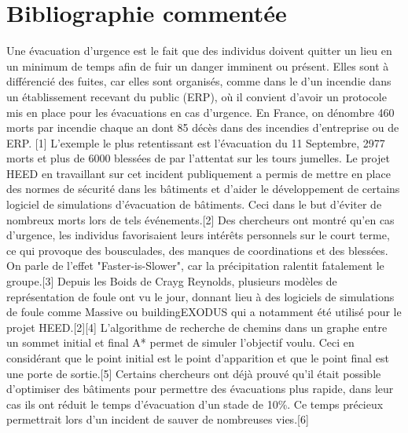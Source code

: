 \documentclass[12pt]{article}
\begin{document}
\section*{Bibliographie commentée}
Une évacuation d'urgence est le fait que des individus doivent quitter un lieu en un minimum de temps afin de fuir un danger imminent ou présent. Elles sont à différencié des fuites, car elles sont organisés,
comme dans le d'un incendie dans un établissement recevant du public (ERP), où il convient d'avoir un protocole mis en place pour les évacuations en cas d'urgence. En France, on dénombre 460 morts par incendie
chaque an dont 85 décès dans des incendies d'entreprise ou de ERP. [1]
\newline\newline
L'exemple le plus retentissant est l'évacuation du 11 Septembre, 2977 morts et plus de 6000 blessées de par l'attentat sur les tours jumelles. Le projet HEED en travaillant sur cet incident publiquement a permis
de mettre en place des normes de sécurité dans les bâtiments et d'aider le développement de certains logiciel de simulations d'évacuation de bâtiments. Ceci dans le but d'éviter de nombreux morts lors de tels événements.[2]
\newline\newline
Des chercheurs ont montré qu'en cas d'urgence, les individus favorisaient leurs intérêts personnels sur le court terme, ce qui provoque des bousculades, des manques de coordinations et des blessées. On parle de l'effet "Faster-is-Slower", car la précipitation ralentit fatalement
le groupe.[3]
\newline\newline
Depuis les Boids de Crayg Reynolds, plusieurs modèles de représentation de foule ont vu le jour, donnant lieu à des logiciels de simulations de foule comme Massive ou buildingEXODUS qui a notamment été utilisé pour le projet HEED.[2][4]
\newline\newline
L'algorithme de recherche de chemins dans un graphe entre un sommet initial et final A* permet de simuler l'objectif voulu. Ceci en considérant que le point initial est le point d'apparition et que le point final est une porte de sortie.[5]
\newline\newline
Certains chercheurs ont déjà prouvé qu'il était possible d'optimiser des bâtiments pour permettre des évacuations plus rapide, dans leur cas ils ont réduit le temps d'évacuation d'un stade de 10\%. Ce temps précieux permettrait lors d'un incident de sauver de nombreuses vies.[6]
\end{document}
